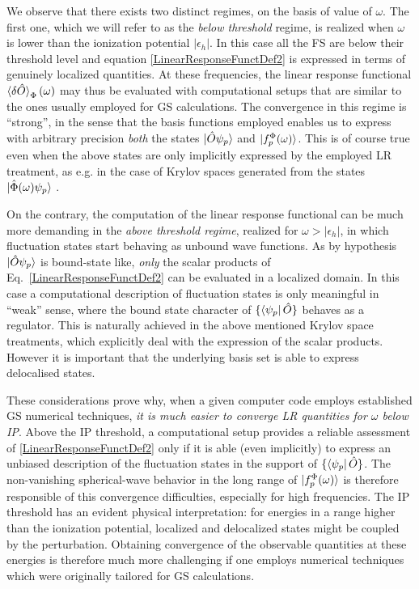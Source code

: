 \documentclass[reprint,aps,prb]{revtex4-1}
\newcommand{\eps}{\epsilon}
\newcommand{\op}[1]{\hat {#1}}
\begin{document}
We observe that there exists two
distinct regimes, on the basis of value of $\omega$.
The first one, which we will refer to as the \emph{below threshold} regime, is realized when
$\omega$ is lower than the ionization potential $|\eps_h|$.
In this case all the FS are below their threshold level and equation \eqref{LinearResponseFunctDef2}
is expressed in terms of genuinely localized
quantities. At these frequencies, the linear response functional $\braket{\delta\op O}_\Phi(\omega)$
may thus be evaluated with computational setups that
are similar to the ones usually employed for GS calculations.
The convergence in this regime is ``strong'', in the sense that the basis functions employed enables us to express
with arbitrary precision \emph{both} the states $\ket{\op O \psi_p}$ and $\ket{f_p^\Phi(\omega)}$.
This is of course true even when the above states are only implicitly expressed by the employed LR treatment,
 as e.g. in the case of Krylov spaces generated from the states $\ket{\op\Phi(\omega) \psi_p}$ \cite{baroni2006,baroni2008,linlinKPM}.

On the contrary, the computation of the linear response functional can be much more demanding in the \emph{above threshold regime}, realized for $\omega>|\eps_h|$, in which fluctuation
states start behaving as unbound wave functions.
As by hypothesis $\ket{\op O \psi_p}$ is bound-state like, \emph{only} the scalar products of Eq.~\eqref{LinearResponseFunctDef2} can be evaluated in a localized domain.
In this case a computational description of fluctuation states is only meaningful in ``weak'' sense,
where the bound state character of $\{\bra{\psi_p}\op O\}$ behaves as a regulator.
This is naturally achieved in the above mentioned Krylov space treatments, which
explicitly deal with the expression of the scalar products. However
it is important that the underlying basis set is able to express delocalised states.

These considerations prove why, when a given computer code employs established GS numerical techniques,
\emph{it is much easier to converge LR quantities for $\omega$ below IP}.
Above the IP threshold, a computational setup
provides a reliable assessment of \eqref{LinearResponseFunctDef2} only if it is able (even implicitly) to express an
unbiased description of the fluctuation states in the support of $\{\bra{\psi_p}\op O\}$.
The non-vanishing spherical-wave behavior in the long range of $\ket{f_p^\Phi(\omega)}$ is therefore responsible
of this convergence difficulties, especially for high frequencies.
The IP threshold has an evident physical interpretation: for energies in a range higher than the ionization potential,
localized and delocalized states might be coupled by the perturbation. Obtaining convergence of the observable quantities at these energies is therefore much more challenging if one employs
numerical techniques which were originally tailored for GS calculations.
\end{document}
